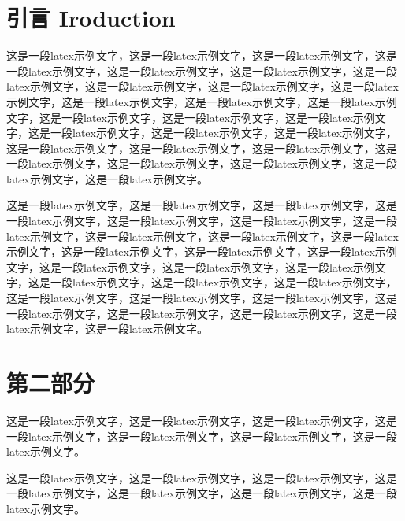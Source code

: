 \documentclass{template} %
\begin{document}
\begin{multicols}{2}

    \section{引言 Iroduction}
这是一段latex示例文字\cite{reddy2013polypharmacology}，这是一段latex示例文字，这是一段latex示例文字，这是一段latex示例文字，这是一段latex示例文字，这是一段latex示例文字，这是一段latex示例文字，这是一段latex示例文字，这是一段latex示例文字，这是一段latex示例文字，这是一段latex示例文字，这是一段latex示例文字，这是一段latex示例文字，这是一段latex示例文字，这是一段latex示例文字，这是一段latex示例文字，这是一段latex示例文字，这是一段latex示例文字，这是一段latex示例文字，这是一段latex示例文字，这是一段latex示例文字，这是一段latex示例文字，这是一段latex示例文字，这是一段latex示例文字，这是一段latex示例文字，这是一段latex示例文字，这是一段latex示例文字。



这是一段latex示例文字\cite{li2020learn}，这是一段latex示例文字，这是一段latex示例文字，这是一段latex示例文字，这是一段latex示例文字，这是一段latex示例文字，这是一段latex示例文字，这是一段latex示例文字，这是一段latex示例文字，这是一段latex示例文字，这是一段latex示例文字，这是一段latex示例文字，这是一段latex示例文字，这是一段latex示例文字，这是一段latex示例文字，这是一段latex示例文字，这是一段latex示例文字，这是一段latex示例文字，这是一段latex示例文字，这是一段latex示例文字，这是一段latex示例文字，这是一段latex示例文字，这是一段latex示例文字，这是一段latex示例文字，这是一段latex示例文字，这是一段latex示例文字，这是一段latex示例文字。


    \section{第二部分}
这是一段latex示例文字\cite{reddy2013polypharmacology}，这是一段latex示例文字，这是一段latex示例文字，这是一段latex示例文字，这是一段latex示例文字，这是一段latex示例文字，这是一段latex示例文字。

这是一段latex示例文字\cite{li2020learn}，这是一段latex示例文字，这是一段latex示例文字，这是一段latex示例文字，这是一段latex示例文字，这是一段latex示例文字，这是一段latex示例文字。
    

\end{multicols}
\end{document}
